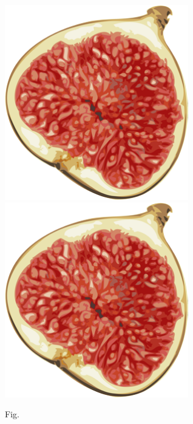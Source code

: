 \documentclass{article}
\begin{document}
  \begin{figure}[h]
    \includegraphics[width=8cm]{fig.png}
    \includegraphics[width=8cm]{fig.png}
    \caption{Fig.}
    \label{fig:fig}
  \end{figure}
\end{document}
